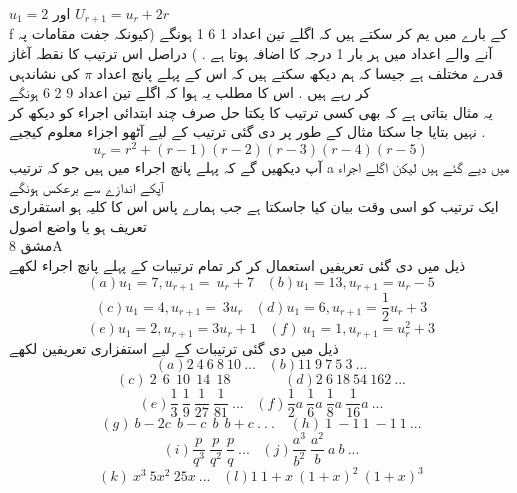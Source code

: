 \(u_{1}=2\)
اور
\(U_{r+1}=u_{r}+2r\)\\
f
کے بارے میں یم کر سکتے ہیں کہ اگلے تین اعداد
1 6 1
ہونگے (کیونکہ جفت مقامات پہ آنے والے اعداد میں ہر بار 1 درجہ کا اضافہ ہوتا ہے . )
دراصل اس ترتیب کا نقطہ آغاز قدرے مختلف ہے جیسا کہ ہم دیکھ سکتے ہیں کہ اس کے پہلے پانچ اعداد
\(\pi\)
کی نشاندہی کر رہے ہیں . اس کا مطلب یہ ہوا کہ اگلے تین اعداد
9 2 6 
ہونگے \\
یہ مثال بتاتی ہے کہ بھی کسی ترتیب کا یکتا حل صرف چند ابتدائی اجراء کو دیکھ کر نہیں بتایا جا سکتا مثال کے طور پر دی گئی ترتیب کے لیے آٹھو اجزاء معلوم کیجیے .
\[u_{r}=r^{2}+(r-1)(r-2)(r-3)(r-4)(r-5)\]
آپ دیکھیں گے کہ پہلے پانچ اجراء میں ہیں جو کہ ترتیب
a
میں دیے گئے ہیں لیکن اگلے اجراء آپکے اندازے سے برعکس ہونگے \\
ایک ترتیب کو اسی وقت بیان کیا جاسکتا ہے جب ہمارے پاس اس کا کلیہ ہو استقراری تعریف ہو یا واضع اصول \\
مشق
8A\\
ذیل میں دی گئی تعریفیں استعمال کر کر تمام ترتیبات کے پہلے پانچ اجراء لکھے \\
\[(a)u_{1} = 7 ,u_{r+1} =\ u_{r} + 7 \hspace{10pt} (b)u_{1} = 13 , u_{r+1} = u_{r}-5 \]
\[(c) u_{1} = 4, u_{r+1} =\ 3u_{r}    \hspace{10pt} (d) u_{1} = 6 , u_{r+1} = \dfrac{1}{2}u_{r} +3 \]
\[(e) u_{1} = 2,u_{r+1} = 3u_{r}+ 1 \hspace{10pt} (f)\ u_{1} = 1  , u_{r+1} = u_{r}^{2} + 3 \]
ذیل میں دی گئی ترتیبات کے لیے استفزاری تعریفین لکھے \\
\[(a) 2 \: 4 \: 6 \:  8 \:  10 \: ... \hspace{10pt} (b) 11 \: 9 \:  7 \:  5 \:  3 \: ... \]
\[(c)\ 2 \ \ 6 \ \ 10 \ \ 14 \ \ 18  \hspace{46pt} (d) 2 \: 6 \: 18 \: 54 \: 162 \: ...\]
\[(e) \frac{1}{3} \: \frac{1}{9} \:  \frac{1}{27} \:  \frac{1}{81} \: ... \hspace{10pt} (f)\frac{1}{2}a\: \frac{1}{6}a \: \frac{1}{8}a  \: \frac{1}{16}a \: ...\]
\[(g)\ b -2c \ \ b - c \ \  b \ \ b + c \ . \ . \ . \ \hspace{10pt} (h)\ 1 \: -1 \: 1 \: -1 \: 1 \: ...\]
\[(i) \frac{p}{q^{3}} \: \frac{p}{q^{2}} \: \frac{p}{q} \: ... \hspace{10pt} (j) \frac{a^{3}}{b^{2}} \:  \frac{a^{2}}{b} \: a \:  b \: ... \]
\[(k)\ x^{3} \:  5x^{2} \:  25x \: ...\hspace{10pt} (l)  1 \:  1+x \:  (1 + x)^{2} \:  (1 + x)^{3} \]

